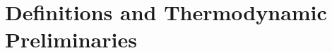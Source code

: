 \documentclass[9pt,bestpractices]{livecoms}
\begin{document}
%
%
%
%





\section{Definitions and Thermodynamic Preliminaries}
\end{document}

